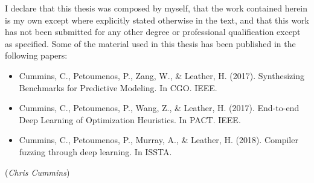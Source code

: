 \begin{preliminary}
  \maketitle

  \begin{acknowledgements}%
  \end{acknowledgements}%

	\begin{declaration}
		I declare that this thesis was composed by myself, that the work contained herein is my own except where explicitly stated otherwise in the text, and that this work has not been submitted for any other degree or professional qualification except as specified. Some of the material used in this thesis has been published in the following papers:
		\begin{itemize}
			\item Cummins, C., Petoumenos, P., Zang, W., \& Leather, H. (2017). Synthesizing Benchmarks for Predictive Modeling. In CGO. IEEE.
			\item Cummins, C., Petoumenos, P., Wang, Z., \& Leather, H. (2017). End-to-end Deep Learning of Optimization Heuristics. In PACT. IEEE.
			\item Cummins, C., Petoumenos, P., Murray, A., \& Leather, H. (2018). Compiler fuzzing through deep learning. In ISSTA.
		\end{itemize}
		\vspace{1in}\raggedleft({\em Chris Cummins\/})
	\end{declaration} 

  \dedication{Dedication Lorem Ipsum}

  \tableofcontents
  \listoffigures
  \listoftables
  \listofalgorithms
  \lstlistoflistings
\end{preliminary}
